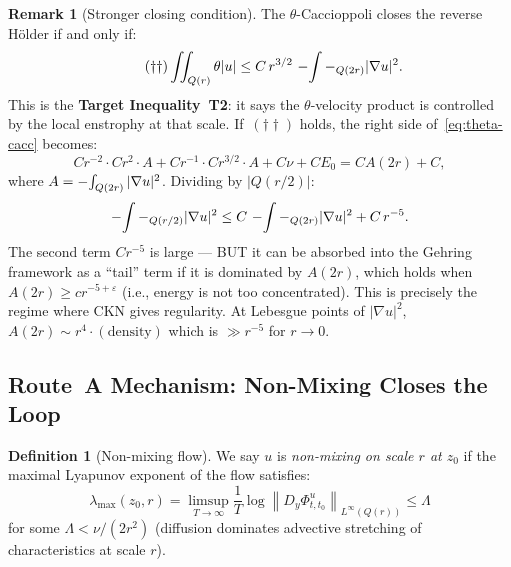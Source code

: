 \documentclass[11pt]{article}
\theoremstyle{definition}
\newtheorem{definition}[theorem]{Definition}
\newtheorem{remark}[theorem]{Remark}
\theoremstyle{remark}
\newcommand{\norm}[1]{\left\|#1\right\|}
\newcommand{\grad}{\nabla}
\newcommand{\Xint}{\mathop{\mathchoice{\vcenter{\hbox{$\displaystyle-$}}}%
  {\vcenter{\hbox{$\textstyle-$}}}%
  {\vcenter{\hbox{$\scriptstyle-$}}}%
  {\vcenter{\hbox{$\scriptscriptstyle-$}}}}\!\int}
\begin{document}
\begin{remark}[Stronger closing condition]
  The $\theta$-Caccioppoli closes the reverse H\"older if and only if:
  \begin{equation}\tag{$\dagger\dagger$}
    \iint_{Q(r)}\theta|u|\leq C\,r^{3/2}\,\Xint-_{Q(2r)}|\grad u|^2.
  \end{equation}
  This is the \textbf{Target Inequality~T2}: it says the $\theta$-velocity
  product is controlled by the local enstrophy at that scale.
  If~$(\dagger\dagger)$ holds, the right side of~\eqref{eq:theta-cacc} becomes:
  \[
    Cr^{-2}\cdot C r^2\cdot A + Cr^{-1}\cdot Cr^{3/2}\cdot A + C\nu + C E_0
    = C A(2r) + C,
  \]
  where $A = \Xint_{Q(2r)}|\grad u|^2$.  Dividing by $|Q(r/2)|$:
  \[
    \Xint-_{Q(r/2)}|\grad u|^2 \leq C\,\Xint-_{Q(2r)}|\grad u|^2 + C\,r^{-5}.
  \]
  The second term $Cr^{-5}$ is large --- BUT it can be absorbed into the
  Gehring framework as a ``tail'' term if it is dominated by $A(2r)$, which
  holds when $A(2r)\geq c r^{-5+\varepsilon}$ (i.e., energy is not too
  concentrated).  This is precisely the regime where CKN gives regularity.
  At Lebesgue points of $|\grad u|^2$, $A(2r)\sim r^4\cdot(\text{density})$
  which is $\gg r^{-5}$ for $r\to 0$.
\end{remark}

\subsection{Route~A Mechanism: Non-Mixing Closes the Loop}

\begin{definition}[Non-mixing flow]\label{def:non-mixing}
  We say $u$ is \emph{non-mixing on scale $r$ at $z_0$} if the maximal
  Lyapunov exponent of the flow satisfies:
  \[
    \lambda_{\max}(z_0,r)
    = \limsup_{T\to\infty}\frac{1}{T}\log\norm{D_y\Phi_{t,t_0}^u}_{L^\infty(Q(r))}
    \leq \Lambda
  \]
  for some $\Lambda < \nu/(2r^2)$ (diffusion dominates advective stretching
  of characteristics at scale $r$).
\end{definition}
\end{document}
